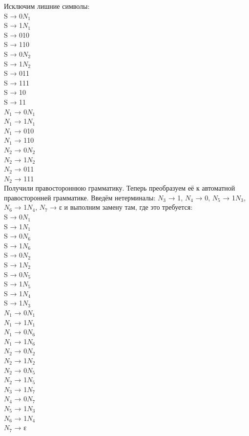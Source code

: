 \documentclass[a4paper,14pt]{extarticle}
\begin{document}
\begin{enumerate}[1.]
Исключим лишние символы:\\
S → 0$N_1$\\
S → 1$N_1$\\
S → 010\\
S → 110\\
S → 0$N_2$\\
S → 1$N_2$\\
S → 011\\
S → 111\\
S → 10\\
S → 11\\
$N_1$ → 0$N_1$\\
$N_1$ → 1$N_1$\\
$N_1$ → 010\\
$N_1$ → 110\\
$N_2$ → 0$N_2$\\
$N_2$ → 1$N_2$\\
$N_2$ → 011\\
$N_2$ → 111\\

    Получили правостороннюю грамматику. Теперь преобразуем её к автоматной правосторонней грамматике. 
    Введём нетерминалы: $N_3$ → 1, $N_4$ → 0, $N_5$ → 1$N_3$, $N_6$ → 1$N_4$, $N_7$ → ε и выполним замену там, где это требуется:\\ 

S → 0$N_1$\\
S → 1$N_1$\\
S → 0$N_6$\\
S → 1$N_6$\\
S → 0$N_2$\\
S → 1$N_2$\\
S → 0$N_5$\\
S → 1$N_5$\\
S → 1$N_4$\\
S → 1$N_3$\\
$N_1$ → 0$N_1$\\
$N_1$ → 1$N_1$\\
$N_1$ → 0$N_6$\\
$N_1$ → 1$N_6$\\
$N_2$ → 0$N_2$\\
$N_2$ → 1$N_2$\\
$N_2$ → 0$N_5$\\
$N_2$ → 1$N_5$\\
$N_3$ → 1$N_7$\\
$N_4$ → 0$N_7$\\
$N_5$ → 1$N_3$\\
$N_6$ → 1$N_4$\\
$N_7$ → ε\\


\end{enumerate}
\end{document}
